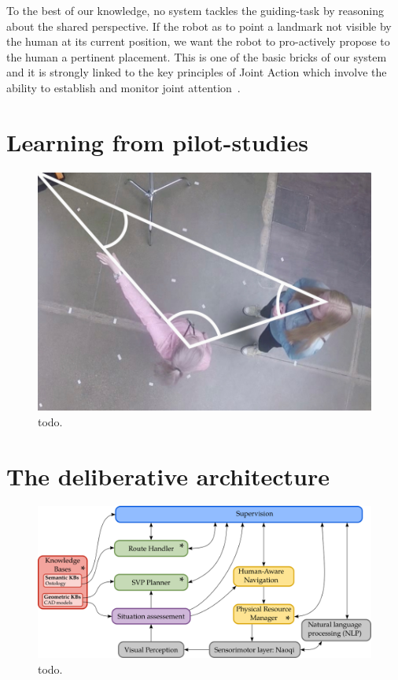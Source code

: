 To the best of our knowledge, no system tackles the guiding-task by reasoning about the shared perspective. If the robot as to point a landmark not visible by the human at its current position, we want the robot to pro-actively propose to the human a pertinent placement. This is one of the basic bricks of our system and it is strongly linked to the key principles of Joint Action which involve the ability to establish and monitor joint attention~\cite{pacherie_2012_phenomenology}.

\section{Learning from pilot-studies}

\begin{figure}[ht!]
\centering
\includegraphics[scale=0.35]{figures/chapter8/human_guide.png}
\caption{\label{fig:chap8_human_guide} todo. }
\end{figure}

\section{The deliberative architecture}

\begin{figure}[ht!]
\centering
\includegraphics[width=\textwidth]{figures/chapter8/architecture.png}
\caption{\label{fig:chap8_architecture} todo. }
\end{figure}

